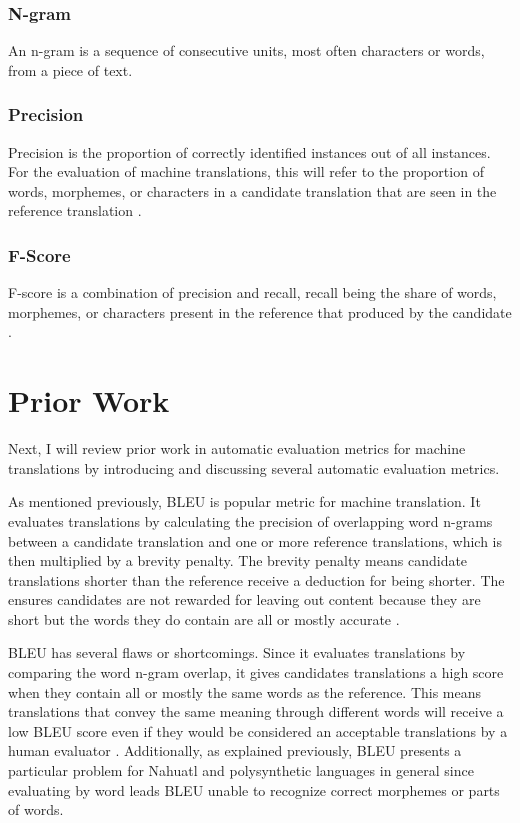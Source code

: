 \documentclass[10pt,twocolumn]{article}
\begin{document}
\subsubsection{N-gram}
An n-gram is a sequence of consecutive units, most often characters or words, from a piece of text. \cite{BLEUGoogle}

\subsubsection{Precision}

Precision is the proportion of correctly identified  instances out of all instances. For the evaluation of machine translations, this will refer to the proportion of words, morphemes, or characters in a candidate translation that are seen in the reference translation \cite{GoogleMLEval}. 

\subsubsection{F-Score}

F-score is a combination of precision and recall\cite{GoogleMLEval}, recall being the share of words, morphemes, or characters present in the reference that produced by the candidate \cite{GoogleMLEval}. 


\section{Prior Work}
Next, I will review prior work in automatic evaluation metrics for machine  translations by introducing and discussing several automatic evaluation metrics.

As mentioned previously, BLEU is popular metric for machine translation. It evaluates translations by calculating the precision of overlapping word n-grams between a candidate translation and one or more reference translations, which is then multiplied by a brevity penalty. The brevity penalty means candidate translations shorter than the reference receive a deduction for being shorter. The ensures candidates are not rewarded for leaving out content because they are short but the words they do contain are all or mostly accurate \cite{BLEU}.

BLEU has several flaws or shortcomings. Since it evaluates translations by comparing the word n-gram overlap, it gives candidates translations a high score when they contain all or mostly the same words as the reference. This means translations that convey the same meaning through different words will receive a low BLEU score even if they would be considered an acceptable translations by a human evaluator \cite{BLEUCritique}. Additionally, as explained previously, BLEU presents a particular problem for Nahuatl and polysynthetic languages in general since evaluating by word leads BLEU unable to recognize correct morphemes or parts of words.
\end{document}
